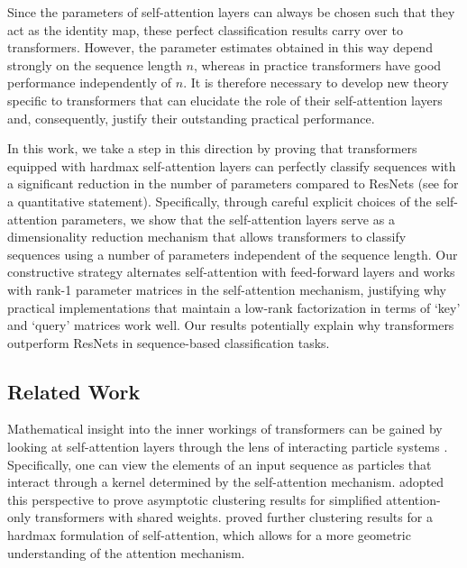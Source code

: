 \documentclass[11pt,a4paper]{amsart}
\begin{document}
Since the parameters of self-attention layers can always be chosen such that they act as the identity map, these perfect classification results carry over to transformers. However, the parameter estimates obtained in this way depend strongly on the sequence length $n$, whereas in practice transformers have good performance independently of $n$. It is therefore necessary to develop new theory specific to transformers that can elucidate the role of their self-attention layers and, consequently, justify their outstanding practical performance. 

In this work, we take a step in this direction by proving that transformers equipped with hardmax self-attention layers can perfectly classify sequences with a significant reduction in the number of parameters compared to ResNets (see  for a quantitative statement). Specifically, through careful explicit choices of the self-attention parameters, we show that the self-attention layers serve as a dimensionality reduction mechanism that allows transformers to classify sequences using a number of parameters independent of the sequence length. Our constructive strategy alternates self-attention with feed-forward layers and works with rank-1 parameter matrices in the self-attention mechanism, justifying why practical implementations that maintain a low-rank factorization in terms of `key' and `query' matrices work well. Our results potentially explain why transformers outperform ResNets in sequence-based classification tasks.
%
\subsection{Related Work}
Mathematical insight into the inner workings of transformers can be gained by looking at self-attention layers through the lens of interacting particle systems \cite{lu2019understanding,sanderSinkformers2022}. Specifically, one can view the elements of an input sequence as particles that interact through a kernel determined by the self-attention mechanism. \citet{geshkovski2023emergence, geshkovski_mathematical_2023} adopted this perspective to prove asymptotic clustering results for simplified attention-only transformers with shared weights. \citet{alcalde2024clustering} proved further clustering results for a hardmax formulation of self-attention, which allows for a more geometric understanding of the attention mechanism.
\end{document}

